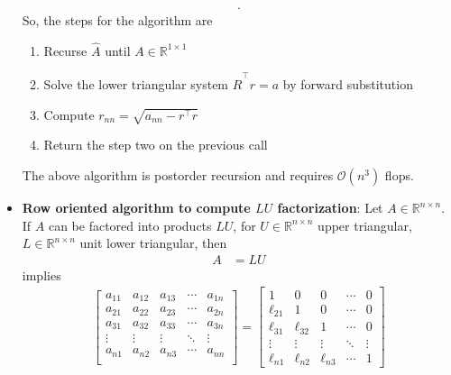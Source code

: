 \documentclass{report}
\begin{document}
\begin{itemize}
\begin{align*}
        .\end{align*}
        So, the steps for the algorithm are 
        \begin{enumerate}
            \item Recurse $\hat{A}$ until $A \in \mathbb{R}^{1\times 1}$
            \item Solve the lower triangular system $\hat{R}^{\top}r = a$ by forward substitution
            \item Compute $r_{nn} = \sqrt{a_{nn} - r^{\top}r} $
            \item Return the step two on the previous call
        \end{enumerate}
        The above algorithm is postorder recursion and requires $\mathcal{O}(n^{3})$ flops.

        \item \textbf{Row oriented algorithm to compute $LU $ factorization}:
            Let $A \in \mathbb{R}^{n\times n}$. If $A$ can be factored into products $LU$, for $U \in \mathbb{R}^{n\times n}$ upper triangular, $L \in \mathbb{R}^{n\times n}$ unit lower triangular, then
            \begin{align*}
                A &= LU  
            \end{align*}
            implies
            \begin{align*}
                \begin{bmatrix}
                    a_{11} & a_{12} & a_{13} & \cdots & a_{1n} \\
                    a_{21} & a_{22} & a_{23} & \cdots & a_{2n} \\
                    a_{31} & a_{32} & a_{33} & \cdots & a_{3n} \\
                    \vdots & \vdots & \vdots & \ddots & \vdots \\
                    a_{n1} & a_{n2} & a_{n3} & \cdots & a_{nn} \\
                \end{bmatrix}
                = \begin{bmatrix}
                    1 & 0 & 0 & \cdots & 0 \\
                    \ell_{21} & 1 & 0 & \cdots & 0 \\
                    \ell_{31} & \ell_{32} & 1 & \cdots & 0 \\
                    \vdots & \vdots & \vdots & \ddots & \vdots \\
                    \ell_{n1} & \ell_{n2} & \ell_{n3} & \cdots & 1
                \end{bmatrix}

\end{align*}
\end{itemize}
\end{document}
